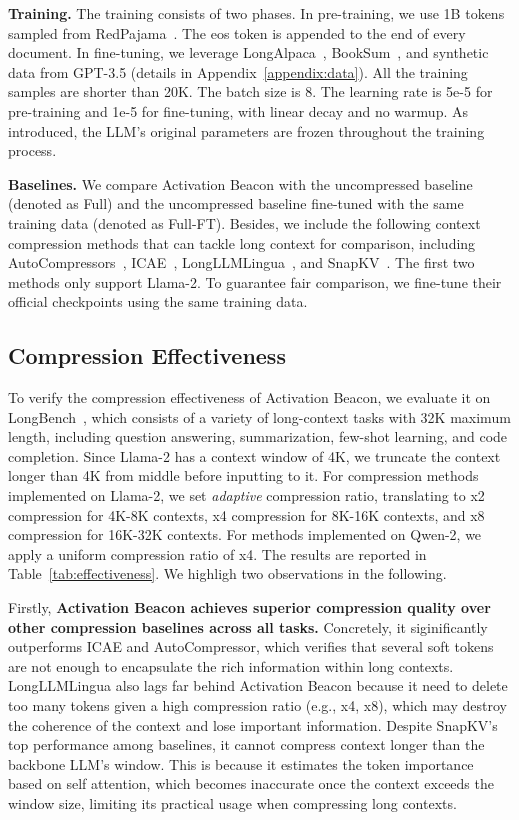 \textbf{Training.} 
The training consists of two phases. In pre-training, we use 1B tokens sampled from RedPajama~\citep{together2023redpajama}. The eos token is appended to the end of every document. In fine-tuning, we leverage LongAlpaca~\citep{chen2023longlora}, BookSum~\citep{kryściński2022booksum}, and synthetic data from GPT-3.5 (details in Appendix~\ref{appendix:data}). All the training samples are shorter than 20K. The batch size is 8. The learning rate is 5e-5 for pre-training and 1e-5 for fine-tuning, with linear decay and no warmup. As introduced, the LLM's original parameters are frozen throughout the training process.

\textbf{Baselines.} We compare Activation Beacon with the uncompressed baseline (denoted as {Full}) and the uncompressed baseline fine-tuned with the same training data (denoted as {Full-FT}). Besides, we include the following context compression methods that can tackle long context for comparison, including AutoCompressors~\citep{chevalier2023autocompressors}, ICAE~\citep{ge2024icae}, LongLLMLingua~\citep{jiang2023longllmlingua}, and SnapKV~\citep{li2024snapkv}. The first two methods only support Llama-2. To guarantee fair comparison, we fine-tune their official checkpoints using the same training data.

\subsection{Compression Effectiveness}
\label{sec:exp-effectiveness}

To verify the compression effectiveness of Activation Beacon, we evaluate it on LongBench~\citep{bai2023longbench}, which consists of a variety of long-context tasks with 32K maximum length, including question answering, summarization, few-shot learning, and code completion. Since Llama-2 has a context window of 4K, we truncate the context longer than 4K from middle before inputting to it. For compression methods implemented on Llama-2, we set \textit{adaptive} compression ratio, translating to x2 compression for 4K-8K contexts, x4 compression for 8K-16K contexts, and x8 compression for 16K-32K contexts. For methods implemented on Qwen-2, we apply a uniform compression ratio of x4. The results are reported in Table~\ref{tab:effectiveness}. We highligh two observations in the following.

Firstly, \textbf{Activation Beacon achieves superior compression quality over other compression baselines across all tasks.} Concretely, it siginificantly outperforms ICAE and AutoCompressor, which verifies that several soft tokens are not enough to encapsulate the rich information within long contexts. LongLLMLingua also lags far behind Activation Beacon because it need to delete too many tokens given a high compression ratio (e.g., x4, x8), which may destroy the coherence of the context and lose important information. Despite SnapKV's top performance among baselines, it cannot compress context longer than the backbone LLM's window. This is because it estimates the token importance based on self attention, which becomes inaccurate once the context exceeds the window size, limiting its practical usage when compressing long contexts.

